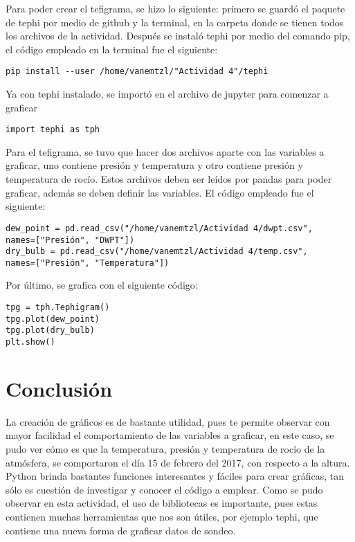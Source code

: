 \documentclass[12pt]{article}
\begin{document}
\begin{doublespace}
Para poder crear el tefigrama, se hizo lo siguiente: primero se guardó el paquete de tephi por medio de github y la terminal, en la carpeta donde se tienen todos los archivos de la actividad. Después se instaló tephi por medio del comando pip, el código empleado en la terminal fue el siguiente:
\begin{verbatim}
pip install --user /home/vanemtzl/"Actividad 4"/tephi
\end{verbatim}
Ya con tephi instalado, se importó en el archivo de jupyter para comenzar a graficar
\begin{verbatim}
import tephi as tph
\end{verbatim}
Para el tefigrama, se tuvo que hacer dos archivos aparte con las variables a graficar, uno contiene presión y temperatura y otro contiene presión y temperatura de rocío. Estos archivos deben ser leídos por pandas para poder graficar, además se deben definir las variables. El código empleado fue el siguiente:

\begin{verbatim}
dew_point = pd.read_csv("/home/vanemtzl/Actividad 4/dwpt.csv", 
names=["Presión", "DWPT"])
dry_bulb = pd.read_csv("/home/vanemtzl/Actividad 4/temp.csv", 
names=["Presión", "Temperatura"])
\end{verbatim}

Por último, se grafica con el siguiente código:

\begin{verbatim}
tpg = tph.Tephigram()
tpg.plot(dew_point)
tpg.plot(dry_bulb)
plt.show()
\end{verbatim}

\pagebreak
\section{Conclusión}
La creación de gráficos es de bastante utilidad, pues te permite observar con mayor facilidad el comportamiento de las variables a graficar, en este caso, se pudo ver cómo es que la temperatura, presión y temperatura de rocío de la atmósfera, se comportaron el día 15 de febrero del 2017, con respecto a la altura. 
\\

Python brinda bastantes funciones interesantes y fáciles para crear gráficas, tan sólo es cuestión de investigar y conocer el código a emplear. Como se pudo observar en esta actividad, el uso de bibliotecas es importante, pues estas contienen muchas herramientas que nos son útiles, por ejemplo tephi, que contiene una nueva forma de graficar datos de sondeo.



\end{doublespace}
\end{document}
